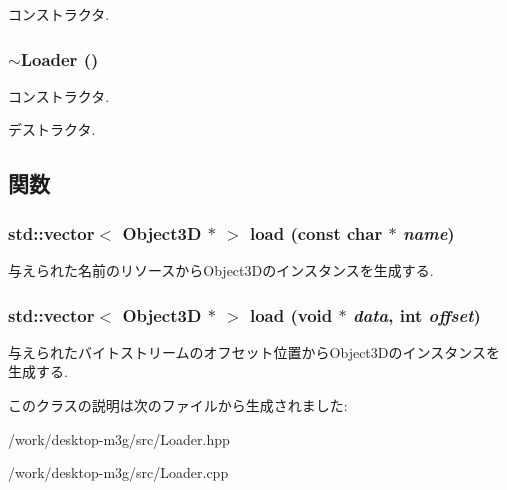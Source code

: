 コンストラクタ. \hypertarget{classm3g_1_1Loader_8bd25dd3f34914f06852c2de2f9db737}{
\subsubsection[{$\sim$Loader}]{\setlength{\rightskip}{0pt plus 5cm}$\sim${\bf Loader} ()}}
\label{classm3g_1_1Loader_8bd25dd3f34914f06852c2de2f9db737}


コンストラクタ.

デストラクタ. 

\subsection{関数}
\hypertarget{classm3g_1_1Loader_27bd86888cdadd349223dcb303e45879}{
\subsubsection[{load}]{\setlength{\rightskip}{0pt plus 5cm}std::vector$<$ {\bf Object3D} $\ast$ $>$ load (const char $\ast$ {\em name})}}
\label{classm3g_1_1Loader_27bd86888cdadd349223dcb303e45879}


与えられた名前のリソースからObject3Dのインスタンスを生成する. \hypertarget{classm3g_1_1Loader_7abddd36a9ee70e67de0e2183bba1aed}{
\subsubsection[{load}]{\setlength{\rightskip}{0pt plus 5cm}std::vector$<$ {\bf Object3D} $\ast$ $>$ load (void $\ast$ {\em data}, \/  int {\em offset})}}
\label{classm3g_1_1Loader_7abddd36a9ee70e67de0e2183bba1aed}


与えられたバイトストリームのオフセット位置からObject3Dのインスタンスを生成する. 

このクラスの説明は次のファイルから生成されました:\begin{CompactItemize}
\item 
/work/desktop-m3g/src/Loader.hpp\item 
/work/desktop-m3g/src/Loader.cpp\end{CompactItemize}
